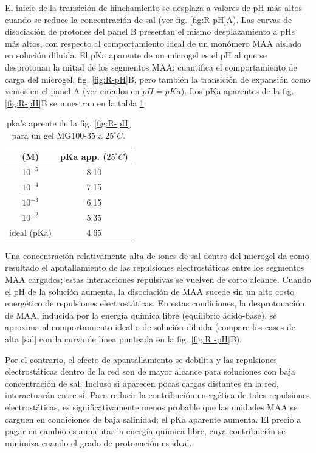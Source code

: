 El inicio de la transici\'on de hinchamiento se desplaza a valores de pH m\'as altos cuando se reduce la concentraci\'on de sal (ver fig. \ref{fig:R-pH}A).
Las curvas de disociaci\'on de protones del panel B presentan el mismo desplazamiento a pHs m\'as altos, con respecto al comportamiento ideal de un mon\'omero MAA aislado en soluci\'on diluida.
El pKa aparente de un microgel es el pH al que se desprotonan la mitad de los segmentos MAA;
cuantifica el comportamiento de carga del microgel, fig. \ref{fig:R-pH}B, pero tambi\'en la transici\'on de expansi\'on como vemos en el panel A (ver circulos en $pH=pKa$).
Los pKa aparentes de la fig. \ref{fig:R-pH}B se muestran en la tabla \ref{table:pKa_app}.

\begin{table}[!htb]
\small
  \begin{tabular}{|cc|}
    \hline
      [NaCl] (M)&  pKa app. ($25 ^\circ C$)  \\
      \hline
    $10^{-5}$ & 8.10  \\
    $10^{-4}$ & 7.15 \\
    $10^{-3}$ & 6.15 \\
    $10^{-2}$ & 5.35 \\
    ideal (pKa) &  $4.65$  \\
    \hline
  \end{tabular}
 \caption{ pka's aprente de la fig. \ref{fig:R-pH} para un gel MG100-35 a $25 ^\circ C$.}
\label{table:pKa_app} 
\end{table}


Una concentraci\'on relativamente alta de iones de sal dentro del microgel da como resultado el apntallamiento de las repulsiones electrost\'aticas entre los segmentos MAA cargados; estas interacciones repulsivas se vuelven de corto alcance.
Cuando el pH de la soluci\'on aumenta, la disociación de MAA sucede sin un alto costo energ\'etico de repulsiones electrost\'aticas.
En estas condiciones, la desprotonaci\'on de MAA, inducida por la energ\'ia qu\'imica libre (equilibrio \'acido-base), se aproxima al comportamiento ideal o de soluci\'on diluida (compare los casos de alta [sal] con la curva de l\'inea punteada en la fig. \ref{fig:R -pH}B).



Por el contrario, el efecto de apantallamiento se debilita y las repulsiones electrost\'aticas dentro de la red son de mayor alcance para soluciones con baja concentraci\'on de sal.
Incluso si aparecen pocas cargas distantes en la red, interactuar\'an entre s\'i.
Para reducir la contribuci\'on energ\'etica de tales repulsiones electrost\'aticas, es significativamente menos probable que las unidades MAA se carguen en condiciones de baja salinidad;
el pKa aparente aumenta.
El precio a pagar en cambio es aumentar la energ\'ia química libre, cuya contribuci\'on se minimiza cuando el grado de protonaci\'on es ideal.



